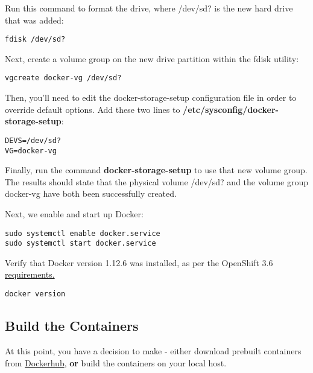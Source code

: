 \documentclass[letterpaper,12pt]{article}
\begin{document}
Run this command to format the drive, where /dev/sd? is the new hard drive that was added:
\vspace{.75em}
\begin{lstlisting}
fdisk /dev/sd?
\end{lstlisting}

Next, create a volume group on the new drive partition within the fdisk utility:
\vspace{.75em}
\begin{lstlisting}
vgcreate docker-vg /dev/sd?
\end{lstlisting}

Then, you'll need to edit the docker-storage-setup configuration file in order to override default options. Add these two lines to \textbf{/etc/sysconfig/docker-storage-setup}:
\vspace{.75em}
\begin{lstlisting}
DEVS=/dev/sd?
VG=docker-vg
\end{lstlisting}

Finally, run the command \textbf{docker-storage-setup} to use that new volume group. The results should state that the physical volume /dev/sd? and the volume group docker-vg have both been successfully created.

Next, we enable and start up Docker:
\vspace{.75em}
\begin{lstlisting}
sudo systemctl enable docker.service
sudo systemctl start docker.service
\end{lstlisting}

Verify that Docker version 1.12.6 was installed, as per the OpenShift 3.6 \href{https://docs.openshift.com/container-platform/3.6/install\_config/install/host\_preparation.html\#installing-docker}{requirements.}
\vspace{.75em}
\begin{lstlisting}
docker version
\end{lstlisting}

\subsection{Build the Containers}\label{/_docker_environment/_build_the_containers}

At this point, you have a decision to make - either download prebuilt containers from \href{https://hub.docker.com/}{Dockerhub}, \textbf{or} build the containers on your local host.
\end{document}
